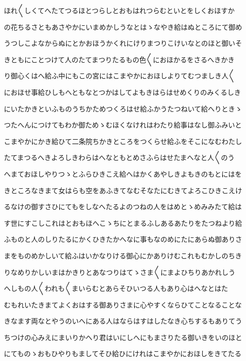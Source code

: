 \documentclass[a4paper,11pt,landscape]{ltjtarticle}
\begin{document}
ほれ〱しくてへたてつるほとつらしとおもはれつらむといとをしくおほすか
\par\medskip
の花ちるさともあさやかにいまめかしうなとはゝなやき給はぬところにて御め
\par\medskip
うつしこよなからぬにとかおほうかくれにけりまつりこけいなとのほと御いそ
\par\medskip
きともにことつけて人のたてまつりたるもの色〱におほかるをさるへきかき
\par\medskip
り御心くはへ給ふ中にもこの宮にはこまやかにおほしよりてむつましき人〱
\par\medskip
におほせ事給ひしもへともなとつかはしてよもきはらはせめくりのみくるしき
\par\medskip
にいたかきといふものうちかためつくろはせ給ふかうたつねいて給へりときゝ
\par\medskip
つたへんにつけてもわか御ためゝむほくなけれはわたり給事はなし御ふみいと
\par\medskip
こまやかにかき給ひて二条院ちかきところをつくらせ給ふをそこになむわたし
\par\medskip
たてまつるへきよろしきわらはへなともとめさふらはせたまへなと人〱のう
\par\medskip
へまておほしやりつゝとふらひきこえ給へはかくあやしきよもきのもとにはを
\par\medskip
きところなきまて女はらも空をあふきてなむそなたにむきてよろこひきこえけ
\par\medskip
るなけの御すさひにてもをしなへたるよのつねの人をはめとゝめみみたて給は
\par\medskip
す世にすこしこれはとおもほへこゝちにとまるふしあるあたりをたつねより給
\par\medskip
ふものと人のしりたるにかくひきたかへなに事もなのめにたにあらぬ御ありさ
\par\medskip
まをものめかしいて給ふはいかなりける御心にかありけむこれもむかしのちき
\par\medskip
りなめりかしいまはかきりとあなつりはてゝさま〱にまよひちりあかれしう
\par\medskip
へしもの人〱われも〱まいらむとあらそひいつる人もあり心はへなとはた
\par\medskip
むもれいたきまてよくおはする御ありさまに心やすくならひてことなることな
\par\medskip
きなます両なとやうのいへにある人はならはすはしたなき心ちするもありてう
\par\medskip
ちつけの心みえにまいりかへり君はいにしへにもまさりたる御いきをいのほと
\par\medskip
にてものゝおもひやりもましてそひ給ひにけれはこまやかにおほしをきてたる
\end{document}
